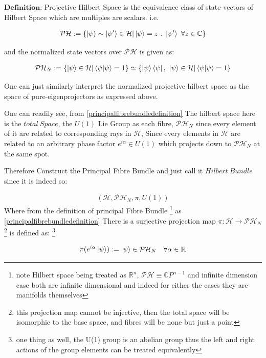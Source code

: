\documentclass[8pt, twocoloumn]{article}
\begin{document}
$\textbf{Definition:}$ Projective Hilbert Space is the equivalence class of state-vectors of Hilbert Space which are multiples are scalars. i.e.


\begin{align}
    \mathcal{PH} := \{ \ket{\psi} \sim \ket{\psi'} \in \mathcal{H}| \ket{\psi} = z \ .\  \ket{\psi'} \ \forall z \in \mathbb{C}\}
\end{align}

and the normalized state vectors over $\mathcal{PH}$ is given as:

\begin{align}
     \mathcal{PH}_{N} := \{  \ket{\psi} \in \mathcal{H}| \braket{\psi | \psi } = 1\} \simeq \{ \ket{\psi}\bra{\psi}, \ \ket{\psi} \in \mathcal{H} | \braket{\psi | \psi } = 1\}
\end{align}

One can just similarly interpret the normalized projective hilbert space as the space of pure-eigenprojectors as expressed above. 

One can readily see, from \ref{principalfibrebundledefinition} The hilbert space here is the $total \ Space$, the $U(1)$ Lie Group as each fibre,  $\mathcal{PH}_N$ since every element of it are related to corresponding rays in $\mathcal{H}$, Since every  elements in $\mathcal{H}$ are related to an arbitrary phase factor $e^{i\alpha} \in U(1)$ which projects down to $\mathcal{PH}_N$ at the same spot.

Therefore Construct the Principal Fibre Bundle and just call it $Hilbert \ Bundle$ since it is indeed so:

\begin{align}
(\mathcal{H}, \mathcal{PH}_N, \pi, U(1))
\end{align}
Where from the definition of principal Fibre Bundle \footnote{
note Hilbert space being treated as $\mathbb{R}^n$, $\mathcal{PH} \equiv {\mathbb{C}P}^{n-1}$ and infinite dimension case both are infinite dimensional and indeed for either the cases they are manifolds themselves} as \ref{principalfibrebundledefinition} There is a surjective projection map $\pi: \mathcal{H} \to \mathcal{PH}_N$\footnote{this projection map cannot be injective, then the total space will be isomorphic to the base space, and fibres will be none but just a point} is defined as: \footnote{one thing as well, the U(1) group is an abelian group thus the left and right actions of the group elements can be treated equivalently}

\begin{align}
    \pi(e^{i\alpha} \ket{\psi}) := \ket{\psi} \in \mathcal{PH}_N \ \ \ \forall \alpha \in \mathbb{R}
\end{align}
\end{document}

